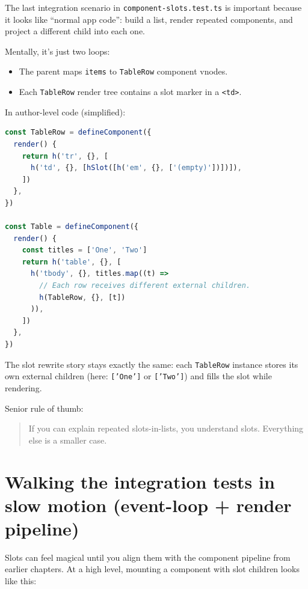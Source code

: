 The last integration scenario in \texttt{component-slots.test.ts} is important because it looks like ``normal app code'':
build a list, render repeated components, and project a different child into each one.

Mentally, it's just two loops:

\begin{itemize}
  \item The parent maps \texttt{items} to \texttt{TableRow} component vnodes.
  \item Each \texttt{TableRow} render tree contains a slot marker in a \texttt{<td>}.
\end{itemize}

In author-level code (simplified):

\begin{lstlisting}[language=JavaScript]
const TableRow = defineComponent({
  render() {
    return h('tr', {}, [
      h('td', {}, [hSlot([h('em', {}, ['(empty)'])])]),
    ])
  },
})

const Table = defineComponent({
  render() {
    const titles = ['One', 'Two']
    return h('table', {}, [
      h('tbody', {}, titles.map((t) =>
        // Each row receives different external children.
        h(TableRow, {}, [t])
      )),
    ])
  },
})
\end{lstlisting}

The slot rewrite story stays exactly the same:
each \texttt{TableRow} instance stores its own external children (here: \texttt{['One']} or \texttt{['Two']}) and fills the slot while rendering.

Senior rule of thumb:
\begin{quote}
If you can explain repeated slots-in-lists, you understand slots. Everything else is a smaller case.
\end{quote}

\section{Walking the integration tests in slow motion (event-loop + render pipeline)}

Slots can feel magical until you align them with the component pipeline from earlier chapters.
At a high level, mounting a component with slot children looks like this:

